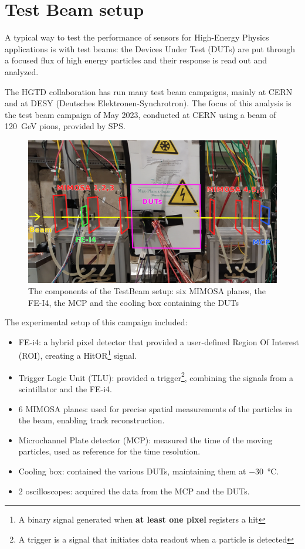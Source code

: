 \chapter{Test Beam setup}

A typical way to test the performance of sensors for High-Energy Physics applications is with test beams: the Devices Under Test (DUTs) are put through a focused flux of high energy particles and their response is read out and analyzed. %

The HGTD collaboration has run many test beam campaigns, mainly at CERN and at DESY (Deutsches Elektronen-Synchrotron). The focus of this analysis is the test beam campaign of May 2023, conducted at CERN using a beam of \qty{120}{\giga\electronvolt} pions, provided by SPS.

\begin{figure}[!ht]
    \centering
    \includegraphics[width=.95\linewidth]{Images/TestBeam_setup/TestBeam_setup_redrawn.png}
    \captionsetup{width=\captionwidth}
    \caption{The components of the TestBeam setup: six MIMOSA planes, the FE-I4, the MCP and the cooling box containing the DUTs}
    \label{fig:testbeam_setup}
\end{figure}

The experimental setup of this campaign included:
\begin{itemize}
    \item FE-i4: a hybrid pixel detector that provided a user-defined Region Of Interest (ROI), creating a HitOR\footnote{A binary signal generated when \textbf{at least one pixel} registers a hit} signal. %
    \item Trigger Logic Unit (TLU): provided a trigger\footnote{A trigger is a signal that initiates data readout when a particle is detected}, combining the signals from a scintillator and the FE-i4. %
    \item 6 MIMOSA planes: used for precise spatial measurements of the particles in the beam, enabling track reconstruction.
    \item Microchannel Plate detector (MCP): measured the time of the moving particles, used as reference for the time resolution.
    \item Cooling box: contained the various DUTs, maintaining them at \qty{-30}{\degreeCelsius}.
    \item 2 oscilloscopes: acquired the data from the MCP and the DUTs. %
\end{itemize}

